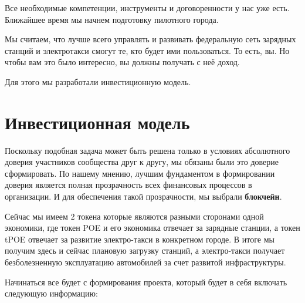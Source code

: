 \documentclass[a4paper,12pt]{report}
\begin{document}
Все необходимые компетенции, инструменты и договоренности у нас уже есть. Ближайшее время мы начнем подготовку пилотного города. 

Мы считаем, что лучше всего управлять и развивать федеральную сеть зарядных станций и электротакси смогут те, кто будет ими пользоваться. То есть, вы. Но чтобы вам это было интересно, вы должны получать с неё доход. 

Для этого мы разработали инвестиционную модель. 





\chapter{Инвестиционная модель}
Поскольку подобная задача может быть решена только в условиях абсолютного доверия участников сообщества друг к другу, мы обязаны были это доверие сформировать. По нашему мнению, лучшим фундаментом в формировании доверия является полная прозрачность всех финансовых процессов в организации. И для обеспечения такой прозрачности, мы выбрали \textbf{блокчейн}. 

Сейчас мы имеем 2 токена которые являются разными сторонами одной экономики, где
токен POE и его экономика отвечает за зарядные станции, а токен tPOE отвечает за развитие электро-такси в конкретном городе. В итоге мы получим здесь и сейчас плановую загрузку станций, а электро-такси получает безболезненную эксплуатацию автомобилей за счет развитой инфраструктуры. 

Начинаться все будет с формирования проекта, который будет в себя включать следующую информацию:
\end{document}
